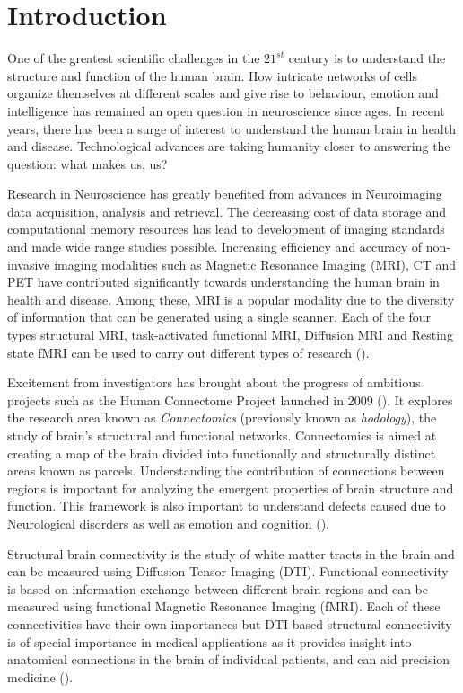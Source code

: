 \documentclass[msthesis.tex]{subfiles}
\begin{document}
\chapter{Introduction}
One of the greatest scientific challenges in the $21^{st}$ century is to understand the structure and function of the human brain. How intricate networks of cells organize themselves at different scales and give rise to behaviour, emotion and intelligence has remained an open question in neuroscience since ages. In recent years, there has been a surge of interest to understand the human brain in health and disease. Technological advances are taking humanity closer to answering the question: what makes us, us? 

Research in Neuroscience has greatly benefited from advances in Neuroimaging data acquisition, analysis and retrieval. The decreasing cost of data storage and computational memory resources has lead to development of imaging standards and made wide range studies possible. Increasing efficiency and accuracy of non-invasive imaging modalities such as Magnetic Resonance Imaging (MRI), CT and PET have contributed significantly towards understanding the human brain in health and disease. Among these, MRI is a popular modality due to the diversity of information that can be generated using a single scanner. Each of the four types structural MRI, task-activated functional MRI, Diffusion MRI and Resting state fMRI can be used to carry out different types of research (\cite{van2016human}). 

Excitement from investigators has brought about the progress of ambitious projects such as the Human Connectome Project launched in 2009 (\cite{van2016human}). It explores the research area known as \textit{Connectomics} (previously known as \textit{hodology}), the study of brain's structural and functional networks. Connectomics is aimed at creating a map of the brain divided into functionally and structurally distinct areas known as parcels. Understanding the contribution of connections between regions is important for analyzing the emergent properties of brain structure and function. This framework is also important to understand defects caused due to Neurological disorders as well as emotion and cognition (\cite{sala2015reorganization}). 

Structural brain connectivity is the study of white matter tracts in the brain and can be measured using Diffusion Tensor Imaging (DTI). Functional connectivity is based on information exchange between different brain regions and can be measured using functional Magnetic Resonance Imaging (fMRI). Each of these connectivities have their own importances but DTI based structural connectivity is of special importance in medical applications as it provides insight into anatomical connections in the brain of individual patients, and can aid precision medicine (\cite{cociu2017multimodal}).
\end{document}
